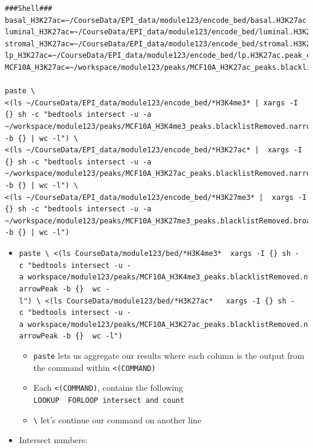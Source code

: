 \documentclass[
]{book}
\providecommand{\tightlist}{%
  \setlength{\itemsep}{0pt}\setlength{\parskip}{0pt}}
\begin{document}
\begin{verbatim}
###Shell###
basal_H3K27ac=~/CourseData/EPI_data/module123/encode_bed/basal.H3K27ac.peak_calls.bed
luminal_H3K27ac=~/CourseData/EPI_data/module123/encode_bed/luminal.H3K27ac.peak_calls.bed
stromal_H3K27ac=~/CourseData/EPI_data/module123/encode_bed/stromal.H3K27ac.peak_calls.bed
lp_H3K27ac=~/CourseData/EPI_data/module123/encode_bed/lp.H3K27ac.peak_calls.bed
MCF10A_H3K27ac=~/workspace/module123/peaks/MCF10A_H3K27ac_peaks.blacklistRemoved.narrowPeak

paste \
<(ls ~/CourseData/EPI_data/module123/encode_bed/*H3K4me3* | xargs -I {} sh -c "bedtools intersect -u -a ~/workspace/module123/peaks/MCF10A_H3K4me3_peaks.blacklistRemoved.narrowPeak -b {} | wc -l") \
<(ls ~/CourseData/EPI_data/module123/encode_bed/*H3K27ac* |  xargs -I {} sh -c "bedtools intersect -u -a ~/workspace/module123/peaks/MCF10A_H3K27ac_peaks.blacklistRemoved.narrowPeak -b {} | wc -l") \
<(ls ~/CourseData/EPI_data/module123/encode_bed/*H3K27me3* |  xargs -I {} sh -c "bedtools intersect -u -a ~/workspace/module123/peaks/MCF10A_H3K27me3_peaks.blacklistRemoved.broadPeak -b {} | wc -l")
\end{verbatim}

\begin{itemize}
\tightlist
\item
  \texttt{paste\ \textbackslash{}\ \textless{}(ls\ CourseData/module123/bed/*H3K4me3*\ \textbar{}\ xargs\ -I\ \{\}\ sh\ -c\ "bedtools\ intersect\ -u\ -a\ workspace/module123/peaks/MCF10A\_H3K4me3\_peaks.blacklistRemoved.narrowPeak\ -b\ \{\}\ \textbar{}\ wc\ -l")\ \textbackslash{}\ \textless{}(ls\ CourseData/module123/bed/*H3K27ac*\ \textbar{}\ \ xargs\ -I\ \{\}\ sh\ -c\ "bedtools\ intersect\ -u\ -a\ workspace/module123/peaks/MCF10A\_H3K27ac\_peaks.blacklistRemoved.narrowPeak\ -b\ \{\}\ \textbar{}\ wc\ -l")}

  \begin{itemize}
  \tightlist
  \item
    \texttt{paste} lets us aggregate our results where each column is the output from the command within \texttt{\textless{}(COMMAND)}
  \item
    Each \texttt{\textless{}(COMMAND)}, contains the following \texttt{LOOKUP\ \textbar{}\ FORLOOP\ intersect\ and\ count}
  \item
    \texttt{\textbackslash{}} let's continue our command on another line
  \end{itemize}
\item
  Intersect numbers:
\end{itemize}
\end{document}
